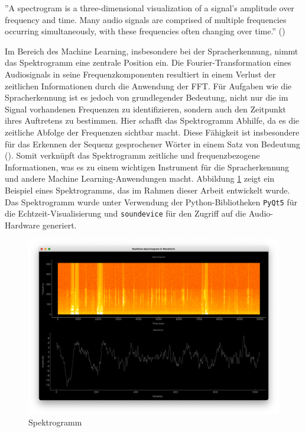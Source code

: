 \documentclass[11pt,a4paper]{article}
\begin{document}
\begin{displayquote}
	''A spectrogram is a three-dimensional visualization of a signal’s amplitude over frequency and
	time. Many audio signals are comprised of multiple frequencies occurring simultaneously, with
	these frequencies often changing over time.'' (\cite[Chapter~15.2.1]{tarr2018hackaudio})
\end{displayquote}

\noindent
Im Bereich des Machine Learning, insbesondere bei der Spracherkennung, nimmt das Spektrogramm eine
zentrale Position ein. Die Fourier-Transformation eines Audiosignals in seine Frequenzkomponenten
resultiert in einem Verlust der zeitlichen Informationen durch die Anwendung der FFT. Für Aufgaben
wie die Spracherkennung ist es jedoch von grundlegender Bedeutung, nicht nur die im Signal
vorhandenen Frequenzen zu identifizieren, sondern auch den Zeitpunkt ihres Auftretens zu bestimmen.
Hier schafft das Spektrogramm Abhilfe, da es die zeitliche Abfolge der Frequenzen sichtbar macht.
Diese Fähigkeit ist insbesondere für das Erkennen der Sequenz gesprochener Wörter in einem Satz von
Bedeutung (\cite{chaudhary2020}). Somit verknüpft das Spektrogramm zeitliche und frequenzbezogene
Informationen, was es zu einem wichtigen Instrument für die Spracherkennung und andere Machine
Learning-Anwendungen macht. Abbildung \ref{fig:spectrogram} zeigt ein Beispiel eines Spektrogramms,
das im Rahmen dieser Arbeit entwickelt wurde. Das Spektrogramm wurde unter Verwendung der
Python-Bibliotheken \texttt{PyQt5} für die Echtzeit-Visualisierung und \texttt{soundevice} für den
Zugriff auf die Audio-Hardware generiert.

\begin{figure}[h]
	\centering
	\includegraphics[width=0.73\linewidth]{img/spectrogram.png}
	\caption{Spektrogramm}
	\label{fig:spectrogram}
\end{figure}
\end{document}

